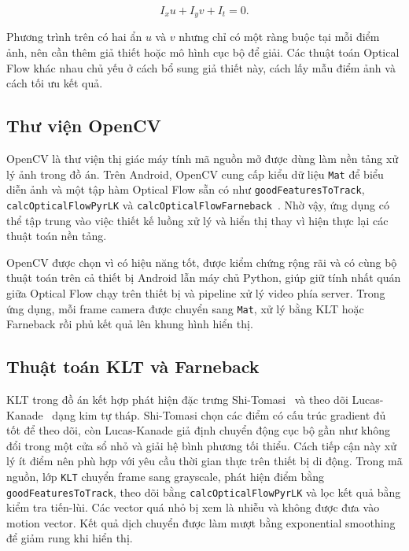 \documentclass[../DoAn.tex]{subfiles}
\begin{document}
\begin{equation}
\label{eq:brightness-constancy}
I_x u + I_y v + I_t = 0.
\end{equation}

Phương trình trên có hai ẩn $u$ và $v$ nhưng chỉ có một ràng buộc tại mỗi điểm ảnh, nên cần thêm giả thiết hoặc mô hình cục bộ để giải. Các thuật toán Optical Flow khác nhau chủ yếu ở cách bổ sung giả thiết này, cách lấy mẫu điểm ảnh và cách tối ưu kết quả.

\subsection{Thư viện OpenCV}
\label{subsection:3.4.2}
OpenCV là thư viện thị giác máy tính mã nguồn mở được dùng làm nền tảng xử lý ảnh trong đồ án. Trên Android, OpenCV cung cấp kiểu dữ liệu \texttt{Mat} để biểu diễn ảnh và một tập hàm Optical Flow sẵn có như \texttt{goodFeaturesToTrack}, \texttt{calcOpticalFlowPyrLK} và \texttt{calcOpticalFlowFarneback}~\cite{opencv-optical-flow}. Nhờ vậy, ứng dụng có thể tập trung vào việc thiết kế luồng xử lý và hiển thị thay vì hiện thực lại các thuật toán nền tảng.

OpenCV được chọn vì có hiệu năng tốt, được kiểm chứng rộng rãi và có cùng bộ thuật toán trên cả thiết bị Android lẫn máy chủ Python, giúp giữ tính nhất quán giữa Optical Flow chạy trên thiết bị và pipeline xử lý video phía server. Trong ứng dụng, mỗi frame camera được chuyển sang \texttt{Mat}, xử lý bằng KLT hoặc Farneback rồi phủ kết quả lên khung hình hiển thị.

\subsection{Thuật toán KLT và Farneback}
\label{subsection:3.4.3}
KLT trong đồ án kết hợp phát hiện đặc trưng Shi-Tomasi~\cite{shi-tomasi1994} và theo dõi Lucas-Kanade~\cite{lucas-kanade1981} dạng kim tự tháp. Shi-Tomasi chọn các điểm có cấu trúc gradient đủ tốt để theo dõi, còn Lucas-Kanade giả định chuyển động cục bộ gần như không đổi trong một cửa sổ nhỏ và giải hệ bình phương tối thiểu. Cách tiếp cận này xử lý ít điểm nên phù hợp với yêu cầu thời gian thực trên thiết bị di động. Trong mã nguồn, lớp \texttt{KLT} chuyển frame sang grayscale, phát hiện điểm bằng \texttt{goodFeaturesToTrack}, theo dõi bằng \texttt{calcOpticalFlowPyrLK} và lọc kết quả bằng kiểm tra tiến-lùi. Các vector quá nhỏ bị xem là nhiễu và không được đưa vào motion vector. Kết quả dịch chuyển được làm mượt bằng exponential smoothing để giảm rung khi hiển thị.
\end{document}
